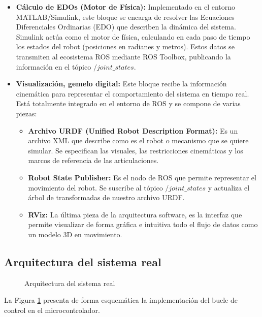 \documentclass[11pt,fleqn]{book} %
\begin{document}
\begin{itemize}[]
	\item \textbf{Cálculo de EDOs (Motor de Física):} Implementado en el entorno MATLAB/Simulink, este bloque se encarga de resolver las Ecuaciones Diferenciales Ordinarias (EDO) que describen la dinámica del sistema. Simulink actúa como el motor de física, calculando en cada paso de tiempo los estados del robot (posiciones en radianes y metros). Estos datos se transmiten al ecosistema ROS mediante ROS Toolbox, publicando la información en el tópico $/joint\_states$.
	
	\item \textbf{Visualización, gemelo digital:} Este bloque recibe la información cinemática para representar el comportamiento del sistema en tiempo real. Está totalmente integrado en el entorno de ROS y se compone de varias piezas: 
	\begin{itemize}[]
		\item \textbf{Archivo URDF (Unified Robot Description Format):} Es un archivo XML que describe como es el robot o mecanismo que se quiere simular. Se especifican las visuales, las restricciones cinemáticas y los marcos de referencia de las articulaciones.  
		\item \textbf{Robot State Publisher:} Es el nodo de ROS que permite representar el movimiento del robot. Se suscribe al tópico $/joint\_states$ y actualiza el árbol de transformadas de nuestro archivo URDF. 
		\item \textbf{RViz:} La última pieza de la arquitectura software, es la interfaz que permite visualizar de forma gráfica e intuitiva todo el flujo de datos como un modelo 3D en movimiento. 
	\end{itemize}
\end{itemize}

\newpage
\subsection{Arquitectura del sistema real}
\label{cap:implement_real}
\begin{figure}[ht]
	\centering
	\resizebox{\textwidth}{!}{%
	}
	\caption{Arquitectura del sistema real}
	\label{fig:arquitectura_sim_fis}
\end{figure}

\FloatBarrier

La Figura \ref{fig:arquitectura_sim_fis} presenta de forma esquemática la implementación del bucle de control en el microcontrolador. 
\end{document}
